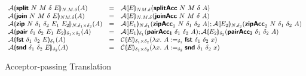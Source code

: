 \begin{figure}[H]
\begin{displaymath}
\begin{array}{lcl}
      \mathcal{A}\llparenthesis \bm{\mathsf{split}}~N~M~\delta~E \rrparenthesis_{N.M.\delta}(A)
      &=& \mathcal{A}\llparenthesis E \rrparenthesis_{NM.\delta}(\bm{\mathsf{splitAcc}}~N~M~\delta~A)
      \\
      \mathcal{A}\llparenthesis \bm{\mathsf{join}}~N~M~\delta~E \rrparenthesis_{NM.\delta}(A)
      &=& \mathcal{A}\llparenthesis E \rrparenthesis_{N.M.\delta}(\bm{\mathsf{joinAcc}}~N~M~\delta~A)
      \\
      \mathcal{A}\llparenthesis \bm{\mathsf{zip}}~N~\delta_1~\delta_2~E_1~E_2 \rrparenthesis_{N.\delta_1\times\delta_2}(A)
      &=& \mathcal{A}\llparenthesis E_1 \rrparenthesis_{N.\delta_1}(\bm{\mathsf{zipAcc}}_1~N~\delta_1~\delta_2~A);
          \mathcal{A}\llparenthesis E_2 \rrparenthesis_{N.\delta_2}(\bm{\mathsf{zipAcc}}_2~N~\delta_1~\delta_2~A)
      \\
      \mathcal{A}\llparenthesis \bm{\mathsf{pair}}~\delta_1~\delta_2~E_1~E_2 \rrparenthesis_{\delta_1\times\delta_2}(A)
      &=& \mathcal{A}\llparenthesis E_1 \rrparenthesis_{\delta_1}(\bm{\mathsf{pairAcc_1}}~\delta_1~\delta_2~A);
          \mathcal{A}\llparenthesis E_2 \rrparenthesis_{\delta_2}(\bm{\mathsf{pairAcc_2}}~\delta_1~\delta_2~A)
      \\
      \mathcal{A}\llparenthesis \bm{\mathsf{fst}}~{\delta_1}~{\delta_2}~E \rrparenthesis_{\delta_1}(A)
      &=& \mathcal{C}\llparenthesis E \rrparenthesis_{\delta_1\times\delta_2}(\lambda x.~A :=_{\delta_1} \bm{\mathsf{fst}}~{\delta_1}~{\delta_2}~x)
      \\
      \mathcal{A}\llparenthesis \bm{\mathsf{snd}}~{\delta_1}~{\delta_2}~E \rrparenthesis_{\delta_2}(A)
      &=& \mathcal{C}\llparenthesis E \rrparenthesis_{\delta_1\times\delta_2}(\lambda x.~A :=_{\delta_2} \bm{\mathsf{snd}}~{\delta_1}~{\delta_2}~x)
    \end{array}
  \end{displaymath}
  \caption{Acceptor-passing Translation}\label{fig:acc-trans}
\end{figure}

